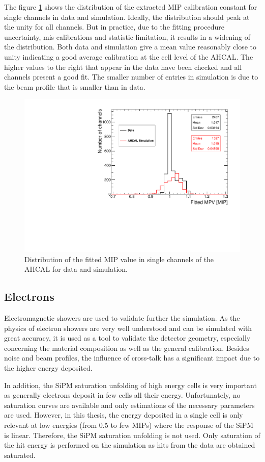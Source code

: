 The figure \ref{fig:MPVData_MC} shows the distribution of the extracted MIP calibration constant for single channels in data and simulation. Ideally, the distribution should peak at the unity for all channels. But in practice, due to the fitting procedure uncertainty, mis-calibrations and statistic limitation, it results in a widening of the distribution. Both data and simulation give a mean value reasonably close to unity indicating a good average calibration at the cell level of the AHCAL. The higher values to the right that appear in the data have been checked and all channels present a good fit. The smaller number of entries in simulation is due to the beam profile that is smaller than in data.

\begin{figure}[htbp!]
	\centering
	\includegraphics[width=0.6\linewidth]{../Thesis_Plots/EnergyCalib/Plots/ComparisonMCData_MPV.pdf}
	\caption{Distribution of the fitted MIP value in single channels of the AHCAL for data and simulation.} \label{fig:MPVData_MC}
\end{figure}

\subsection{Electrons}

Electromagnetic showers are used to validate further the simulation. As the physics of electron showers are very well understood and can be simulated with great accuracy, it is used as a tool to validate the detector geometry, especially concerning the material composition as well as the general calibration. Besides noise and beam profiles, the influence of cross-talk has a significant impact due to the higher energy deposited.

In addition, the SiPM saturation unfolding of high energy cells is very important as generally electrons deposit in few cells all their energy. Unfortunately, no saturation curves are available and only estimations of the necessary parameters are used. However, in this thesis, the energy deposited in a single cell is only relevant at low energies (from 0.5 to few MIPs) where the response of the SiPM is linear. Therefore, the SiPM saturation unfolding is not used. Only saturation of the hit energy is performed on the simulation as hits from the data are obtained saturated.

